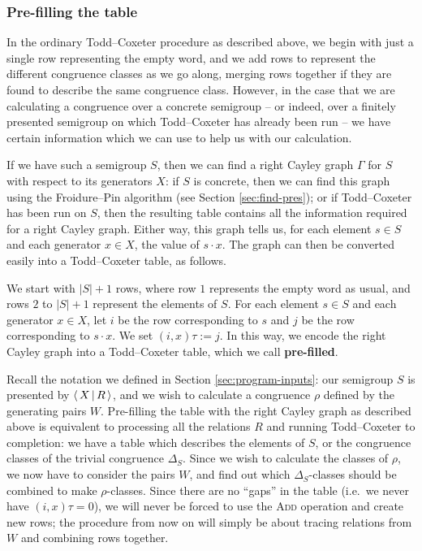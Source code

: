 \subsubsection{Pre-filling the table}
\label{sec:tc-prefill}
In the ordinary Todd--Coxeter procedure as described above, we begin with just a
single row representing the empty word, and we add rows to represent the
different congruence classes as we go along, merging rows together if they are
found to describe the same congruence class.  However, in the case that we are
calculating a congruence over a concrete semigroup -- or indeed, over a finitely
presented semigroup on which Todd--Coxeter has already been run -- we have certain
information which we can use to help us with our calculation.

If we have such a semigroup $S$, then we can find a right Cayley graph $\Gamma$
for $S$ with respect to its generators $X$: if $S$ is concrete, then we can find
this graph using the Froidure--Pin algorithm (see Section \ref{sec:find-pres});
or if Todd--Coxeter has been run on $S$, then the resulting table contains all
the information required for a right Cayley graph.  Either way, this graph tells us, for
each element $s \in S$ and each generator $x \in X$, the value of $s \cdot x$.
The graph can then be converted easily into a Todd--Coxeter table, as follows.

We start with $|S| + 1$
rows, where row $1$ represents the empty word as usual, and rows $2$ to $|S| + 1$
represent the elements of $S$.  For each element $s \in S$ and each generator
$x \in X$, let $i$ be the row corresponding to $s$ and $j$ be the row
corresponding to $s \cdot x$.  We set $(i, x)\tau := j$.  In this way, we encode
the right Cayley graph into a Todd--Coxeter table, which we call
\textbf{pre-filled}.

Recall the notation we defined in Section \ref{sec:program-inputs}: our
semigroup $S$ is presented by $\left\langle\,X\,\middle|\,R\,\right\rangle$, and we wish to calculate a congruence
$\rho$ defined by the generating pairs $W$.  Pre-filling the table with the
right Cayley graph as described above is equivalent to processing all the
relations $R$ and running Todd--Coxeter to completion: we have a table which
describes the elements of $S$, or the congruence classes of the trivial
congruence $\Delta_S$.  Since we wish to calculate the classes of $\rho$, we now
have to consider the pairs $W$, and find out which $\Delta_S$-classes should be
combined to make $\rho$-classes.  Since there are no ``gaps'' in the table (i.e.~we never have
$(i,x)\tau=0$), we will never be forced to use the \textsc{Add} operation and
create new rows; the procedure from now on will simply be about tracing
relations from $W$ and combining rows together.

